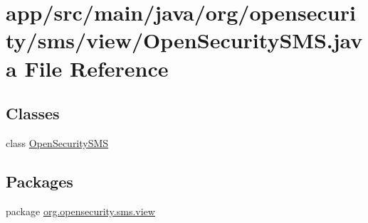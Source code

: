 \hypertarget{a00031}{\section{app/src/main/java/org/opensecurity/sms/view/\+Open\+Security\+S\+M\+S.java File Reference}
\label{a00031}
}
\subsection*{Classes}
\begin{DoxyCompactItemize}
\item 
class \hyperlink{a00011}{Open\+Security\+S\+M\+S}
\end{DoxyCompactItemize}
\subsection*{Packages}
\begin{DoxyCompactItemize}
\item 
package \hyperlink{a00041}{org.\+opensecurity.\+sms.\+view}
\end{DoxyCompactItemize}
